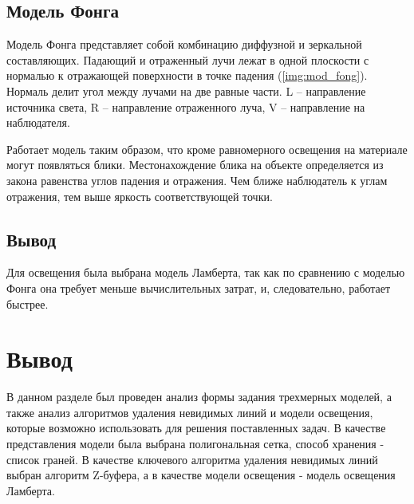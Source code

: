 \subsection{Модель Фонга}

Модель Фонга \cite{lamber_fong} представляет собой комбинацию диффузной и зеркальной составляющих. Падающий и отраженный лучи лежат в одной плоскости с
нормалью к отражающей поверхности в точке падения (\ref{img:mod_fong}). Нормаль
делит угол между лучами на две равные части. L – направление источника света, R – направление отраженного луча, V – направление на наблюдателя.


Работает модель таким образом, что кроме равномерного освещения на материале могут появляться блики. Местонахождение блика на объекте определяется из закона равенства углов падения и отражения. Чем ближе
наблюдатель к углам отражения, тем выше яркость соответствующей точки.

\subsection*{Вывод}
Для освещения была выбрана модель Ламберта, так как по сравнению с моделью Фонга она требует меньше вычислительных затрат, и, следовательно,
работает быстрее.

\section*{Вывод}
В данном разделе был проведен анализ формы задания трехмерных моделей, а также анализ алгоритмов удаления невидимых линий и модели освещения, которые возможно использовать для решения поставленных задач. В качестве представления модели была выбрана полигональная сетка, способ хранения - список граней. В качестве ключевого алгоритма удаления невидимых линий выбран алгоритм Z-буфера, а в качестве модели освещения - модель освещения Ламберта. 
